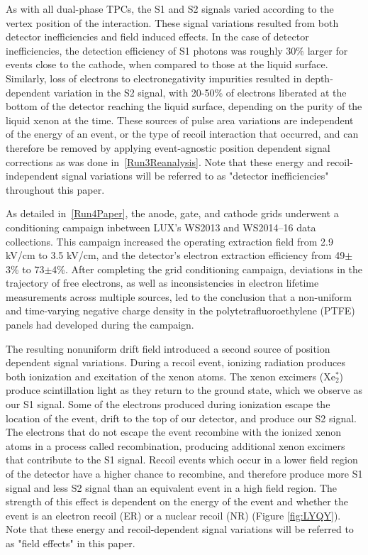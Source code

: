 As with all dual-phase TPCs, the S1 and S2 signals varied according to the vertex position of the interaction.  These signal variations resulted from both detector inefficiencies and field induced effects.  In the case of detector inefficiencies, the detection efficiency of S1 photons was roughly 30\% larger for events close to the cathode, when compared to those at the liquid surface. Similarly, loss of electrons to electronegativity impurities resulted in depth-dependent variation in the S2 signal, with 20-50\% of electrons liberated at the bottom of the detector reaching the liquid surface, depending on the purity of the liquid xenon at the time.  These sources of pulse area variations are independent of the energy of an event, or the type of recoil interaction that occurred, and can therefore be removed by applying event-agnostic position dependent signal corrections as was done in~\ref{Run3Reanalysis}.  Note that these energy and recoil-independent signal variations will be referred to as "detector inefficiencies" throughout this paper. 




As detailed in~\ref{Run4Paper}, the anode, gate, and cathode grids underwent a conditioning campaign inbetween LUX's WS2013 and WS2014–16 data collections.  This campaign increased the operating extraction field from 2.9 kV/cm to 3.5 kV/cm, and the detector's electron extraction efficiency from 49$\pm$3\% to 73$\pm$4\%.  After completing the grid conditioning campaign, deviations in the trajectory of free electrons, as well as inconsistencies in electron lifetime measurements across multiple sources, led to the conclusion that a non-uniform and time-varying negative
charge density in the polytetrafluoroethylene (PTFE)
panels had developed during the campaign.

The resulting nonuniform drift field introduced a second source of position dependent signal variations.  During a recoil event, ionizing radiation produces both ionization and excitation of the xenon atoms.  The xenon excimers (Xe$_2^*$) produce scintillation light as they return to the ground state, which we observe as our S1 signal. Some of the electrons produced during ionization escape the location of the event, drift to the top of our detector, and produce our S2 signal.  The electrons that do not escape the event recombine with the ionized xenon atoms in a process called recombination, producing additional xenon excimers that contribute to the S1 signal.  Recoil events which occur in a lower field region of the detector have a higher chance to recombine, and therefore produce more S1 signal and less S2 signal than an equivalent event in a high field region.  The strength of this effect is dependent on the energy of the event and whether the event is an electron recoil (ER) or a nuclear recoil (NR) (Figure \ref{fig:LYQY}).  Note that these energy and recoil-dependent signal variations will be referred to as "field effects" in this paper.  

